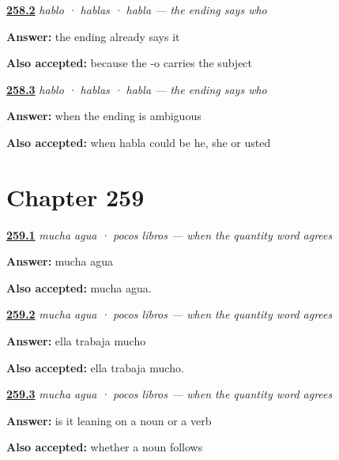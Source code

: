 \noindent\begin{minipage}[t]{\linewidth}
\raggedright
\hyperlink{review-ES-C66-la-terminacion-dice-quien-drop}{\textbf{258.2}} \emph{hablo · hablas · habla — the ending says who}\par
\small \textbf{Answer:} the ending already says it\par
\footnotesize \textbf{Also accepted:} because the -o carries the subject
\end{minipage}\par\medskip

\noindent\begin{minipage}[t]{\linewidth}
\raggedright
\hyperlink{review-ES-C66-la-terminacion-dice-quien-back}{\textbf{258.3}} \emph{hablo · hablas · habla — the ending says who}\par
\small \textbf{Answer:} when the ending is ambiguous\par
\footnotesize \textbf{Also accepted:} when habla could be he, she or usted
\end{minipage}\par\medskip

\section*{Chapter 259}

\noindent\begin{minipage}[t]{\linewidth}
\raggedright
\hyperlink{review-ES-C66-mucha-agua-noun}{\textbf{259.1}} \emph{mucha agua · pocos libros — when the quantity word agrees}\par
\small \textbf{Answer:} mucha agua\par
\footnotesize \textbf{Also accepted:} mucha agua.
\end{minipage}\par\medskip

\noindent\begin{minipage}[t]{\linewidth}
\raggedright
\hyperlink{review-ES-C66-mucha-agua-verb}{\textbf{259.2}} \emph{mucha agua · pocos libros — when the quantity word agrees}\par
\small \textbf{Answer:} ella trabaja mucho\par
\footnotesize \textbf{Also accepted:} ella trabaja mucho.
\end{minipage}\par\medskip

\noindent\begin{minipage}[t]{\linewidth}
\raggedright
\hyperlink{review-ES-C66-mucha-agua-test}{\textbf{259.3}} \emph{mucha agua · pocos libros — when the quantity word agrees}\par
\small \textbf{Answer:} is it leaning on a noun or a verb\par
\footnotesize \textbf{Also accepted:} whether a noun follows
\end{minipage}\par\medskip

